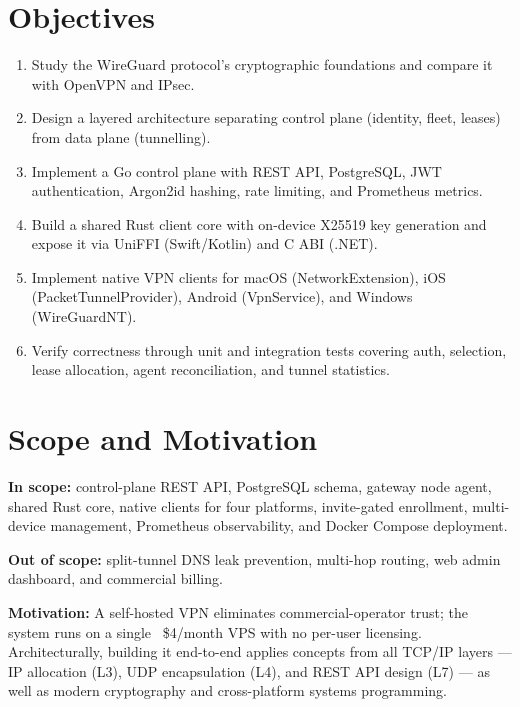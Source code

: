 \documentclass[12pt,a4paper]{report}
\begin{document}
\section{Objectives}

\begin{enumerate}[leftmargin=*, topsep=2pt, itemsep=1pt]
  \item Study the WireGuard protocol's cryptographic foundations and compare it with OpenVPN and IPsec.
  \item Design a layered architecture separating control plane (identity, fleet, leases) from data plane (tunnelling).
  \item Implement a Go control plane with REST API, PostgreSQL, JWT authentication, Argon2id hashing, rate limiting, and Prometheus metrics.
  \item Build a shared Rust client core with on-device X25519 key generation and expose it via UniFFI (Swift/Kotlin) and C ABI (.NET).
  \item Implement native VPN clients for macOS (NetworkExtension), iOS (PacketTunnelProvider), Android (VpnService), and Windows (WireGuardNT).
  \item Verify correctness through unit and integration tests covering auth, selection, lease allocation, agent reconciliation, and tunnel statistics.
\end{enumerate}

\section{Scope and Motivation}

\textbf{In scope:} control-plane REST API, PostgreSQL schema, gateway node agent, shared Rust core, native clients for four platforms, invite-gated enrollment, multi-device management, Prometheus observability, and Docker Compose deployment.

\textbf{Out of scope:} split-tunnel DNS leak prevention, multi-hop routing, web admin dashboard, and commercial billing.

\textbf{Motivation:} A self-hosted VPN eliminates commercial-operator trust; the system runs on a single ~\$4/month VPS with no per-user licensing. Architecturally, building it end-to-end applies concepts from all TCP/IP layers — IP allocation (L3), UDP encapsulation (L4), and REST API design (L7) — as well as modern cryptography and cross-platform systems programming.

\end{document}
